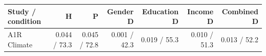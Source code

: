 
\begin{tabular}{lrrrrrr}
\toprule
Study / condition & H & P & Gender D & Education D & Income D & Combined D\\
\midrule
A1R Climate & 0.044 / 73.3 & 0.045 / 72.8 & 0.001 / 42.3 & 0.019 / 55.3 & 0.010 / 51.3 & 0.013 / 52.2\\
\bottomrule
\end{tabular}
